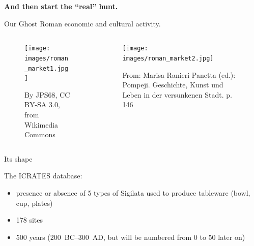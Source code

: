 \documentclass[10pt, notes=show]{beamer}
\begin{document}
\begin{frame}
    \bf \huge
    And then start the ``real'' hunt.
\end{frame}
\begin{frame}{Our Ghost}
    Roman economic and cultural activity.
    \begin{columns}

        \begin{column}{0.45\linewidth}
            \begin{figure}
                \texttt{[image: images/roman\_market1.jpg]}\\
                \parbox{.90\textwidth}{\tiny By JPS68, CC BY-SA 3.0, from Wikimedia Commons}
            \end{figure}
        \end{column}
        \begin{column}{0.45\linewidth}

            \begin{figure}
                \texttt{[image: images/roman\_market2.jpg]}\\
                \parbox{.85\textwidth}{\tiny From: Marisa Ranieri Panetta (ed.): Pompeji. Geschichte, Kunst und Leben in der versunkenen Stadt. p. 146}
            \end{figure}
        \end{column}

    \end{columns}

    \begin{figure}
    \end{figure}
\end{frame}

\begin{frame}{Its shape}

    The ICRATES database:
    \begin{itemize}
        \item presence or absence of 5 types of Sigilata used to produce tableware (bowl, cup, plates)
        \item 178 sites
        \item 500 years (200~BC--300~AD, {\small but will be numbered from 0 to 50 later on})

    \end{itemize}
\end{frame}
\end{document}
